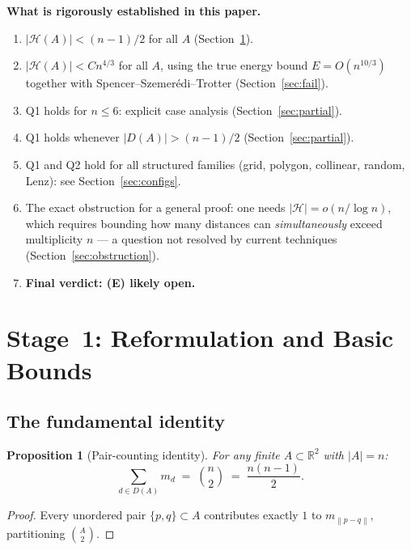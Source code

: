 \documentclass[12pt,a4paper]{amsart}
\theoremstyle{plain}
\newtheorem{proposition}[theorem]{Proposition}
\theoremstyle{definition}
\newcommand{\R}{\mathbb{R}}
\newcommand{\abs}[1]{\left\lvert #1 \right\rvert}
\newcommand{\norm}[1]{\left\lVert #1 \right\rVert}
\newcommand{\cH}{\mathcal{H}}
\begin{document}
\begin{mdframed}[style=partial]
\textbf{What is rigorously established in this paper.}
\begin{enumerate}[label=(\arabic*)]
  \item $\abs{\cH(A)} < (n-1)/2$ for all $A$
        (Section~\ref{sec:reformulation}).
  \item $\abs{\cH(A)} < Cn^{4/3}$ for all $A$, using the true
        energy bound $E = O(n^{10/3})$ together with
        Spencer--Szemer\'edi--Trotter (Section~\ref{sec:fail}).
  \item Q1 holds for $n \le 6$: explicit case analysis
        (Section~\ref{sec:partial}).
  \item Q1 holds whenever $\abs{D(A)} > (n-1)/2$
        (Section~\ref{sec:partial}).
  \item Q1 and Q2 hold for all structured families (grid, polygon,
        collinear, random, Lenz): see Section~\ref{sec:configs}.
  \item The exact obstruction for a general proof: one needs
        $\abs{\cH} = o(n/\log n)$, which requires bounding how many
        distances can \emph{simultaneously} exceed multiplicity $n$
        --- a question not resolved by current techniques
        (Section~\ref{sec:obstruction}).
  \item \textbf{Final verdict: (E) likely open.}
\end{enumerate}
\end{mdframed}

\section{Stage~1: Reformulation and Basic Bounds}
\label{sec:reformulation}

\subsection{The fundamental identity}

\begin{proposition}[Pair-counting identity]
\label{prop:identity}
For any finite $A \subset \R^2$ with $\abs{A} = n$:
\[
  \sum_{d \in D(A)} m_d \;=\; \binom{n}{2} \;=\; \frac{n(n-1)}{2}.
\]
\end{proposition}

\begin{proof}
Every unordered pair $\{p,q\} \subset A$ contributes exactly $1$ to
$m_{\norm{p-q}}$, partitioning $\binom{A}{2}$.
\end{proof}
\end{document}
